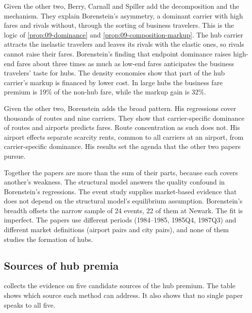 Given the other two, Berry, Carnall and Spiller add the decomposition and the mechanism. They explain
Borenstein's asymmetry, a dominant carrier with high fares and rivals without, through the sorting of business
travelers. This is the logic of \cref{prop:09-dominance} and \cref{prop:09-composition-markup}. The hub
carrier attracts the inelastic travelers and leaves its rivals with the elastic ones, so rivals cannot raise
their fares. Borenstein's finding that endpoint dominance raises high-end fares about three times as much as
low-end fares anticipates the business travelers' taste for hubs. The density economies show that part of the
hub carrier's markup is financed by lower cost. In large hubs the business fare premium is 19\% of the
non-hub fare, while the markup gain is 32\%.

Given the other two, Borenstein adds the broad pattern. His regressions cover thousands of routes and nine
carriers. They show that carrier-specific dominance of routes and airports predicts fares. Route concentration as
such does not. His airport effects separate scarcity rents, common to all carriers at an airport, from
carrier-specific dominance. His results set the agenda that the other two papers pursue.

Together the papers are more than the sum of their parts, because each covers another's weakness. The
structural model answers the quality confound in Borenstein's regressions. The event study supplies
market-based evidence that does not depend on the structural model's equilibrium assumption. Borenstein's
breadth offsets the narrow sample of 24 events, 22 of them at Newark. The fit is imperfect. The papers use
different periods (1984--1985, 1985Q4, 1987Q3) and different market definitions (airport pairs and city
pairs), and none of them studies the formation of hubs.

\subsection{Sources of hub premia}\label{sec:09-synthesis-sources}

 collects the evidence on five candidate sources of the hub premium. The table shows
which source each method can address. It also shows that no single paper speaks to all five.

